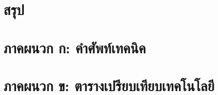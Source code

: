 \documentclass[a4paper]{article}
\begin{document}
\section{สรุป}
\begin{justify}
\end{justify}

\printbibliography[title=เอกสารอ้างอิง]

\appendix
\section{ภาคผนวก ก: คำศัพท์เทคนิค}
\begin{justify}
\end{justify}

\section{ภาคผนวก ข: ตารางเปรียบเทียบเทคโนโลยี}
\begin{justify}
\end{justify}
\end{document}
